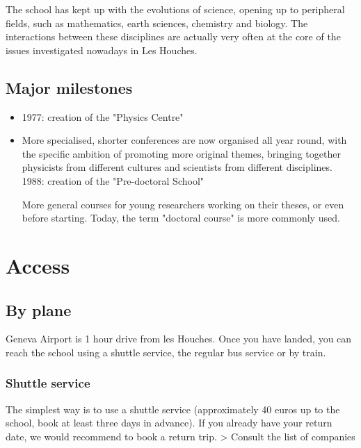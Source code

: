 The school has kept up with the evolutions of science, opening up to peripheral fields, such as mathematics, earth sciences, chemistry and biology. The interactions between these disciplines are actually very often at the core of the issues investigated nowadays in Les Houches.

\section{Major milestones}

\begin{itemize}

\item 1977: creation of the "Physics Centre"

\item More specialised, shorter conferences are now organised all year round, with the specific ambition of promoting more original themes, bringing together physicists from different cultures and scientists from different disciplines.
1988: creation of the "Pre-doctoral School"

More general courses for young researchers working on their theses, or
even before starting. Today, the term "doctoral course" is more
commonly used.

\end{itemize}

\newpage

\chapter{Access}

\section{By plane}

Geneva Airport is 1 hour drive from les Houches. 
Once you have landed, you can reach the school using a shuttle service, the regular bus service or by train.

\subsection{Shuttle service}

The simplest way is to use a shuttle service (approximately 40 euros up to the school, book at least three days in advance). If you already have your return date, we would recommend to book a return trip.
> Consult the list of companies

